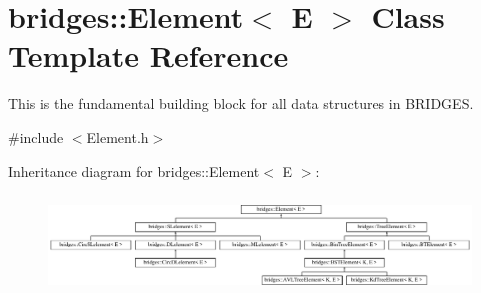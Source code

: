 \hypertarget{classbridges_1_1_element}{}\section{bridges\+::Element$<$ E $>$ Class Template Reference}
\label{classbridges_1_1_element}


This is the fundamental building block for all data structures in B\+R\+I\+D\+G\+ES.  




{\ttfamily \#include $<$Element.\+h$>$}

Inheritance diagram for bridges\+::Element$<$ E $>$\+:\begin{figure}[H]
\begin{center}
\leavevmode
\includegraphics[height=2.641510cm]{classbridges_1_1_element}
\end{center}
\end{figure}
